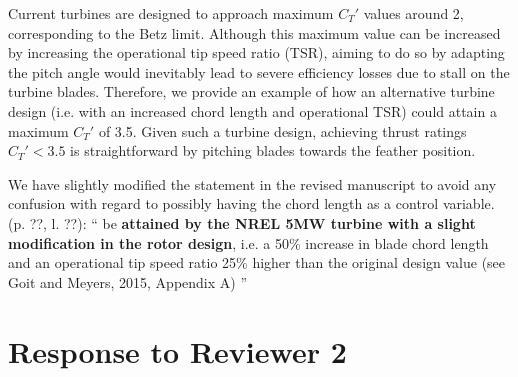 \documentclass[]{article}
\begin{document}
Current turbines are designed to approach maximum $C_T'$ values around 2, corresponding to the Betz limit. Although this maximum value can be increased by increasing the operational tip speed ratio (TSR), aiming to do so by adapting the pitch angle would inevitably lead to severe efficiency losses due to stall on the turbine blades. Therefore, we provide an example of how an alternative turbine design (i.e. with an increased chord length and operational TSR) could attain a maximum $C_T'$ of 3.5. Given such a turbine design, achieving thrust ratings $C_T' < 3.5$ is straightforward by pitching blades towards the feather position. 

We have slightly modified the statement in the revised manuscript to avoid any confusion with regard to possibly having the chord length as a control variable. (p. ??, l. ??):
``
be \textbf{attained by the NREL 5MW turbine with a slight modification in the rotor design}, i.e. a 50\% increase in blade chord length and an operational tip speed ratio 25\% higher than 
the original design value (see Goit and Meyers, 2015, Appendix A)
'' 




\clearpage
\section*{Response to Reviewer 2}
\end{document}
